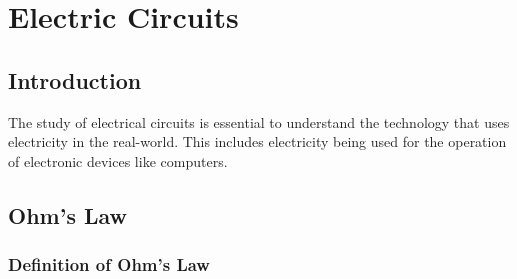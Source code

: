 \chapter{Electric Circuits}
\label{p:em:ec11}


\section{Introduction}

The study of electrical circuits is essential to understand the technology that uses electricity in the real-world. This includes electricity being used for the operation of electronic devices like computers.




\section{Ohm's Law}

\subsection{Definition of Ohm's Law}


